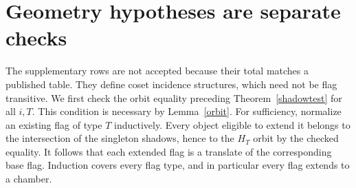 \section{Geometry hypotheses are separate checks}
The supplementary rows are not accepted because their total matches a
published table. They define coset incidence structures, which need not
be flag transitive. We first check the orbit equality preceding
Theorem~\ref{shadowtest} for all $i,T$. This condition is necessary by
Lemma~\ref{orbit}. For sufficiency, normalize an existing flag of type
$T$ inductively. Every object eligible to extend it belongs to the
intersection of the singleton shadows, hence to the $H_T$ orbit by the
checked equality. It follows that each extended flag is a translate of
the corresponding base flag. Induction covers every flag type, and
in particular every flag extends to a chamber.

